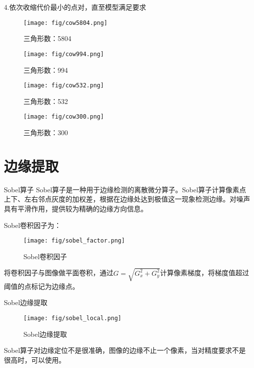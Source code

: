 \documentclass[10.5pt]{beamer}
\begin{document}
\begin{frame}{4.依次收缩代价最小的点对，直至模型满足要求}
\begin{figure}[H]
\begin{minipage}{0.48\linewidth}
  \centerline{\texttt{[image: fig/cow5804.png]}}
  \caption{三角形数：5804}
\end{minipage}
\hfill
\begin{minipage}{0.48\linewidth}
  \centerline{\texttt{[image: fig/cow994.png]}}
  \caption{三角形数：994}
\end{minipage}
\vfill
\begin{minipage}{0.48\linewidth}
  \centerline{\texttt{[image: fig/cow532.png]}}
  \caption{三角形数：532}
\end{minipage}
\hfill
\begin{minipage}{0.48\linewidth}
  \centerline{\texttt{[image: fig/cow300.png]}}
  \caption{三角形数：300}
\end{minipage}
\end{figure}

\end{frame}

\section{边缘提取}

\begin{frame}{Sobel算子}
Sobel算子是一种用于边缘检测的离散微分算子。Sobel算子计算像素点上下、左右邻点灰度的加权差，根据在边缘处达到极值这一现象检测边缘。对噪声具有平滑作用，提供较为精确的边缘方向信息。

Sobel卷积因子为：
\begin{figure}[!t]
\centering
\texttt{[image: fig/sobel\_factor.png]}
\caption{Sobel卷积因子}
\label{fig_4}
\end{figure}
将卷积因子与图像做平面卷积，通过$G = \sqrt{G_{x}^{2} + G_{y}^{2}}$计算像素梯度，将梯度值超过阈值的点标记为边缘点。

    
\end{frame}

\begin{frame}{Sobel边缘提取}
\begin{figure}[!t]
\centering
\texttt{[image: fig/sobel\_local.png]}
\caption{Sobel边缘提取}
\label{fig_5}
\end{figure}

Sobel算子对边缘定位不是很准确，图像的边缘不止一个像素，当对精度要求不是很高时，可以使用。
\end{frame}
\end{document}

